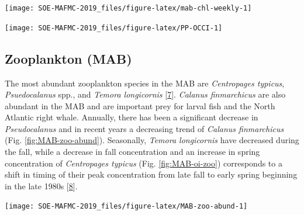 \documentclass[10pt,]{article}
\let\origfigure\figure
\let\endorigfigure\endfigure
\renewenvironment{figure}[1][2] {
    \expandafter\origfigure\expandafter[H]
} {
    \endorigfigure
}
\begin{document}
\begin{figure}

{\centering \texttt{[image: SOE-MAFMC-2019\_files/figure-latex/mab-chl-weekly-1]} 

}

\caption{Weekly chlorophyll concentrations in the Mid-Atlantic are shown by the colored line for 2018. The long-term mean is shown in black, and shading indicates +/- 1 sample SD.}\label{fig:mab-chl-weekly}
\end{figure}

\begin{figure}

{\centering \texttt{[image: SOE-MAFMC-2019\_files/figure-latex/PP-OCCI-1]} 

}

\caption{Monthly primary production trends show the annual cycle (i.e. the peak during the summer months) and the changes over time for each month.}\label{fig:PP-OCCI}
\end{figure}

\subsection{Zooplankton (MAB)}\label{zooplankton-mab}

The most abundant zooplankton species in the MAB are \emph{Centropages
typicus}, \emph{Psuedocalanus} spp., and \emph{Temora longicornis}
{[}\protect\hyperlink{ref-morse_distinct_2017}{7}{]}. \emph{Calanus
finmarchicus} are also abundant in the MAB and are important prey for
larval fish and the North Atlantic right whale. Annually, there has been
a significant decrease in \emph{Pseudocalanus} and in recent years a
decreasing trend of \emph{Calanus finmarchicus} (Fig.
\ref{fig:MAB-zoo-abund}). Seasonally, \emph{Temora longicornis} have
decreased during the fall, while a decrease in fall concentration and an
increase in spring concentration of \emph{Centropages typicus} (Fig.
\ref{fig:MAB-oi-zoo}) corresponds to a shift in timing of their peak
concentration from late fall to early spring beginning in the late 1980s
{[}\protect\hyperlink{ref-bi_decadal_2014}{8}{]}.

\begin{figure}

{\centering \texttt{[image: SOE-MAFMC-2019\_files/figure-latex/MAB-zoo-abund-1]} 

}

\caption{Abundance anomaly time series for key zooplankton species found in the MAB.}\label{fig:MAB-zoo-abund}
\end{figure}
\end{document}
